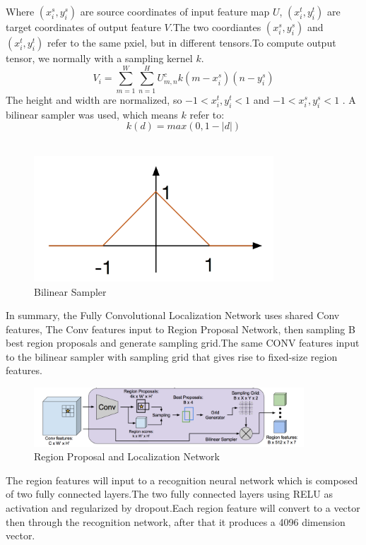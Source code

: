 \documentclass[12pt,a4paper]{report}
\begin{document}
Where $(x_i^s,y_i^s)$ are source coordinates of input feature map $U$, $(x_i^t,y_i^t)$ are target coordinates of output feature $V$.The two coordiantes $(x_i^s,y_i^s)$ and $(x_i^t,y_i^t)$ refer to the same pxiel, but in different tensors.To compute output tensor, we normally with a sampling kernel $k$.\cite{spatial}
\[V_i=\sum\limits_{m=1}^W\sum\limits_{n=1}^HU_{m,n}^c k(m-x_i^s)(n-y_i^s)\]
The height and width are normalized, so $-1<x_i^t,y_i^t<1$ and $-1<x_i^s,y_i^s<1$ . A bilinear sampler was used, which means $k$ refer to:
$$k(d)=max(0,1-|d|)$$\\
\begin{figure}[h]
\centering
\includegraphics[width=0.8\textwidth]{bilinear2.png}
\caption{Bilinear Sampler}
\end{figure}

In summary, the Fully Convolutional Localization Network uses shared  Conv features, The Conv features input to Region Proposal Network, then sampling B best region proposals and generate sampling grid.The same CONV features input to the bilinear sampler with sampling grid that gives rise to fixed-size region features.

\begin{figure}[h]
\centering
\includegraphics[width=0.9\textwidth]{rpn.png}
\caption{Region Proposal and Localization Network\cite{densecap}}
\end{figure}

The region features will input to a recognition neural network which is composed of two fully connected layers.The two fully connected layers using RELU as activation and regularized by dropout.Each region feature will convert to a vector then through the recognition network, after that it produces a 4096 dimension vector. \\
\end{document}
